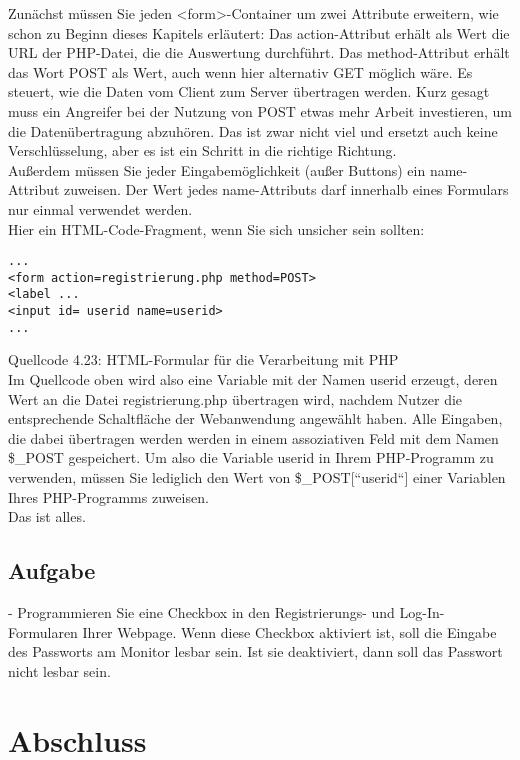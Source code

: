 Zunächst müssen Sie jeden <form>-Container um zwei Attribute erweitern, wie schon zu Beginn dieses Kapitels erläutert: Das action-Attribut erhält als Wert die URL der PHP-Datei, die die Auswertung durchführt. Das method-Attribut erhält das Wort POST als Wert, auch wenn hier alternativ GET möglich wäre. Es steuert, wie die Daten vom Client zum Server übertragen werden. Kurz gesagt muss ein Angreifer bei der Nutzung von POST etwas mehr Arbeit investieren, um die Datenübertragung abzuhören. Das ist zwar nicht viel und ersetzt auch keine Verschlüsselung, aber es ist ein Schritt in die richtige Richtung.\\

Außerdem müssen Sie jeder Eingabemöglichkeit (außer Buttons) ein name-Attribut zuweisen. Der Wert jedes name-Attributs darf innerhalb eines Formulars nur einmal verwendet werden.\\

Hier ein HTML-Code-Fragment, wenn Sie sich unsicher sein sollten:\\

\begin{verbatim}
...
<form action=registrierung.php method=POST>
<label ...
<input id= userid name=userid>
...
\end{verbatim}
Quellcode 4.23: HTML-Formular für die Verarbeitung mit PHP\\

Im Quellcode oben wird also eine Variable mit der Namen userid erzeugt, deren Wert an die Datei registrierung.php übertragen wird, nachdem Nutzer die entsprechende Schaltfläche der Webanwendung angewählt haben. Alle Eingaben, die dabei übertragen werden werden in einem assoziativen Feld mit dem Namen \$\_POST gespeichert. Um also die Variable userid in Ihrem PHP-Programm zu verwenden, müssen Sie lediglich den Wert von \$\_POST[``userid``] einer Variablen Ihres PHP-Programms zuweisen. \\

Das ist alles. 

\subsection{Aufgabe}

-	Programmieren Sie eine Checkbox in den Registrierungs- und Log-In-Formularen Ihrer Webpage. Wenn diese Checkbox aktiviert ist, soll die Eingabe des Passworts am Monitor lesbar sein. Ist sie deaktiviert, dann soll das Passwort nicht lesbar sein.

\section{Abschluss}

